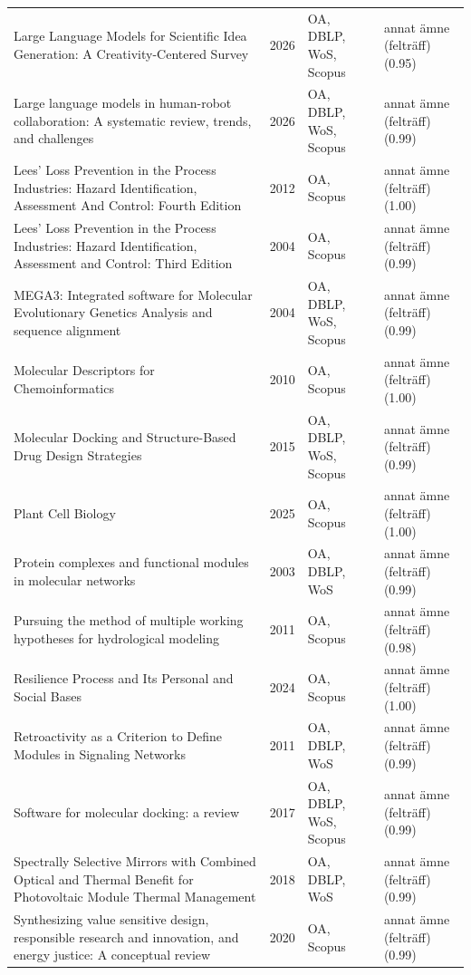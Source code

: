 \begin{longtable}{@{}%
  >{\raggedright\arraybackslash}p{}c%
  >{\raggedright\arraybackslash}p{}%
  >{\raggedright\arraybackslash}p{}@{}}
Large Language Models for Scientific Idea Generation: A Creativity-Centered Survey & 2026 & OA, DBLP, WoS, Scopus & annat ämne (felträff) (0.95) \\
Large language models in human-robot collaboration: A systematic review, trends, and challenges & 2026 & OA, DBLP, WoS, Scopus & annat ämne (felträff) (0.99) \\
Lees' Loss Prevention in the Process Industries: Hazard Identification, Assessment And Control: Fourth Edition & 2012 & OA, Scopus & annat ämne (felträff) (1.00) \\
Lees' Loss Prevention in the Process Industries: Hazard Identification, Assessment and Control: Third Edition & 2004 & OA, Scopus & annat ämne (felträff) (0.99) \\
MEGA3: Integrated software for Molecular Evolutionary Genetics Analysis and sequence alignment & 2004 & OA, DBLP, WoS, Scopus & annat ämne (felträff) (0.99) \\
Molecular Descriptors for Chemoinformatics & 2010 & OA, Scopus & annat ämne (felträff) (1.00) \\
Molecular Docking and Structure-Based Drug Design Strategies & 2015 & OA, DBLP, WoS, Scopus & annat ämne (felträff) (0.99) \\
Plant Cell Biology & 2025 & OA, Scopus & annat ämne (felträff) (1.00) \\
Protein complexes and functional modules in molecular networks & 2003 & OA, DBLP, WoS & annat ämne (felträff) (0.99) \\
Pursuing the method of multiple working hypotheses for hydrological modeling & 2011 & OA, Scopus & annat ämne (felträff) (0.98) \\
Resilience Process and Its Personal and Social Bases & 2024 & OA, Scopus & annat ämne (felträff) (1.00) \\
Retroactivity as a Criterion to Define Modules in Signaling Networks & 2011 & OA, DBLP, WoS & annat ämne (felträff) (0.99) \\
Software for molecular docking: a review & 2017 & OA, DBLP, WoS, Scopus & annat ämne (felträff) (0.99) \\
Spectrally Selective Mirrors with Combined Optical and Thermal Benefit for Photovoltaic Module Thermal Management & 2018 & OA, DBLP, WoS & annat ämne (felträff) (0.99) \\
Synthesizing value sensitive design, responsible research and innovation, and energy justice: A conceptual review & 2020 & OA, Scopus & annat ämne (felträff) (0.99) \\

\end{longtable}
